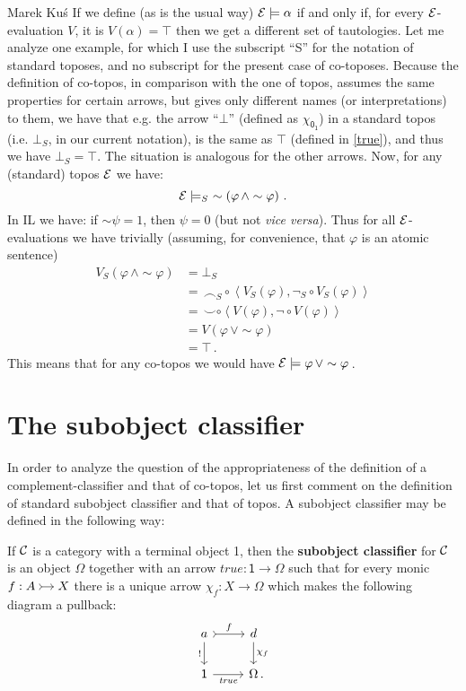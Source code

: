 \begin{artengenv}{Marek Ku\'s}
If we define (as is the usual way) $\mathcal{E} \models \alpha$ if and only if, for every $ \mathcal{E}$-evaluation $ V $, it is $ V(\alpha)=\top $ then we get a different set of tautologies. Let me analyze one example, for which I use the subscript ``S'' for the notation of standard toposes, and no subscript for the present case of co-toposes. Because the definition of co-topos, in comparison with the one of topos, assumes the same properties for certain arrows, but gives only different names (or interpretations) to them, we have that e.g. the arrow ``$ \bot $'' (defined as $ \chi_{\textsf{0}_{\textsf{1}}} $) in a standard topos (i.e. $ \bot_S $, in our current notation), is the same as $ \top $ (defined in \eqref{true}), and thus we have $ \bot_S=\top $. The situation is analogous for the other arrows. Now, for any (standard) topos $ \mathcal{E} $ we have:
\[\mathcal{E}\models_S \ \sim \left(\varphi\, \land \sim\varphi\right)\,.
\]
In IL we have: if $\sim\! \psi = 1$, then $\psi=0$ (but not \textit{vice versa}). Thus for all $\mathcal{E}$-evaluations we have trivially (assuming, for convenience, that $ \varphi $ is an atomic sentence)
\begin{align*}
V_S(\varphi\, \land \sim\varphi) &= \bot_S \\
&= \, \smallfrown_S \circ \left< V_S(\varphi), \lnot_S \circ V_S(\varphi)\right>\\
&=\,\smallsmile \circ \left< V(\varphi), \lnot \circ V(\varphi)\right>\\
&=V( \varphi\, \lor \sim\varphi)\\
&=\top \,. 
\end{align*}
This means that for any co-topos we would have $\mathcal{E} \models \varphi\, \lor \sim\varphi\,$.

\section{The subobject classifier}

In order to analyze the question of the appropriateness of the definition of a comple\-ment-classifier and that of co-topos, let us first comment on the definition of standard subobject classifier and that of topos. A subobject classifier may be defined in the following way:

\begin{definition}
	If $ \mathcal{C} $ is a category with a terminal object \textsf{1}, then the \textbf{subobject classifier} for $ \mathcal{C} $ is an object $\Omega$ together with an arrow $ \textit{true}: \textsf{1} \to \Omega $ such that for every monic $\begin{tikzcd}[cramped, sep=small] f: A \ar[r, tail]  & X \end{tikzcd}$ there is a unique arrow $ \chi_f :X \to \Omega$  which makes the following diagram a pullback:
	\[\begin{tikzcd} 
	a \arrow[r, "f", tail] \arrow[d,"!"']    & d \arrow[d, "\chi_f"] \\
	\textsf{1} \arrow[r, "\textit{true}"'] & \Omega \nospacepunct{.}
 	\end{tikzcd}
	\]
\end{definition}


\end{artengenv}
